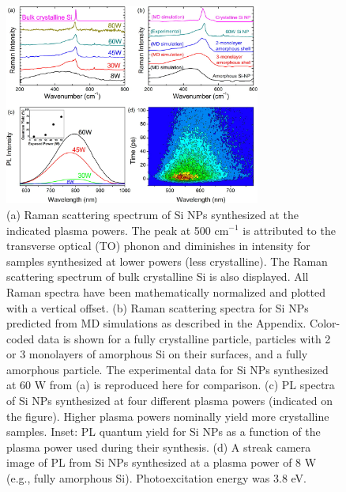 \begin{figure}
\begin{center}
\includegraphics[width=0.75\textwidth]{./Chapter6/amsi3.jpeg}
\caption[Raman scattering and PL from Si NPs synthesized at a variety of powers.]{(a) Raman scattering spectrum of Si NPs synthesized at the indicated plasma powers. The peak at 500 cm$^{-1}$ is attributed to the transverse optical (TO) phonon and diminishes in intensity for samples synthesized at lower powers (less crystalline). The Raman scattering spectrum of bulk crystalline Si is also displayed. All Raman spectra have been mathematically normalized and plotted with a vertical offset. (b) Raman scattering spectra for Si NPs predicted from MD simulations as described in the Appendix. Color-coded data is shown for a fully crystalline particle, particles with 2 or 3 monolayers of amorphous Si on their surfaces, and a fully amorphous particle. The experimental data for Si NPs synthesized at 60 W from (a) is reproduced here for comparison. (c) PL spectra of Si NPs synthesized at four different plasma powers (indicated on the figure). Higher plasma powers nominally yield more crystalline samples. Inset: PL quantum yield for Si NPs as a function of the plasma power used during their synthesis. (d) A streak camera image of PL from Si NPs synthesized at a plasma power of 8 W (e.g., fully amorphous Si). Photoexcitation energy was 3.8 eV.}
\label{f:amsi3}
\end{center}
\end{figure}

